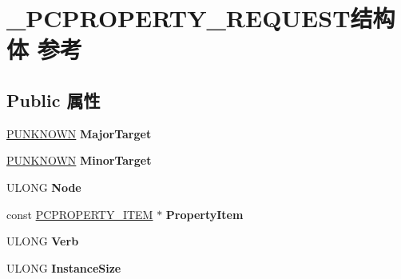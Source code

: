 \hypertarget{struct___p_c_p_r_o_p_e_r_t_y___r_e_q_u_e_s_t}{}\section{\+\_\+\+P\+C\+P\+R\+O\+P\+E\+R\+T\+Y\+\_\+\+R\+E\+Q\+U\+E\+S\+T结构体 参考}
\label{struct___p_c_p_r_o_p_e_r_t_y___r_e_q_u_e_s_t}
\subsection*{Public 属性}
\begin{DoxyCompactItemize}
\item 
\mbox{\label{struct___p_c_p_r_o_p_e_r_t_y___r_e_q_u_e_s_t_ab2522dd80ab79f5feacc568dad9caf5e}} 
\hyperlink{interface_i_unknown}{P\+U\+N\+K\+N\+O\+WN} {\bfseries Major\+Target}
\item 
\mbox{\label{struct___p_c_p_r_o_p_e_r_t_y___r_e_q_u_e_s_t_a894cc4dbe8f86ee3788c9ce0649e56e8}} 
\hyperlink{interface_i_unknown}{P\+U\+N\+K\+N\+O\+WN} {\bfseries Minor\+Target}
\item 
\mbox{\label{struct___p_c_p_r_o_p_e_r_t_y___r_e_q_u_e_s_t_aa70953cd349b4db56631f338e0193b7f}} 
U\+L\+O\+NG {\bfseries Node}
\item 
\mbox{\label{struct___p_c_p_r_o_p_e_r_t_y___r_e_q_u_e_s_t_aadcb226fd48dc2a54e9122da9aa54ae4}} 
const \hyperlink{struct_p_c_p_r_o_p_e_r_t_y___i_t_e_m}{P\+C\+P\+R\+O\+P\+E\+R\+T\+Y\+\_\+\+I\+T\+EM} $\ast$ {\bfseries Property\+Item}
\item 
\mbox{\label{struct___p_c_p_r_o_p_e_r_t_y___r_e_q_u_e_s_t_ab406668caa76c9451d52ba86f4f60ab0}} 
U\+L\+O\+NG {\bfseries Verb}
\item 
\mbox{\label{struct___p_c_p_r_o_p_e_r_t_y___r_e_q_u_e_s_t_a1bac572f0e4806e808f7b6fe368fd102}} 
U\+L\+O\+NG {\bfseries Instance\+Size}
\item 
\mbox{\label{struct___p_c_p_r_o_p_e_r_t_y___r_e_q_u_e_s_t_ab6f29e7c576a11f5ca16e9ee3ef2c5f4}} 

\end{DoxyCompactItemize}
